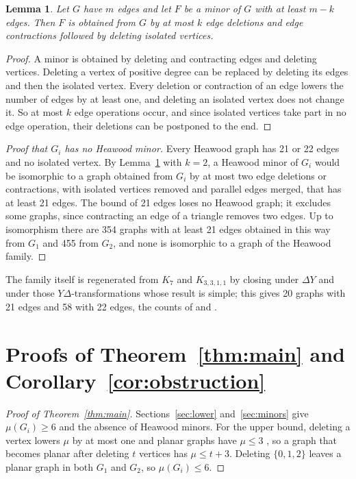 \documentclass[11pt]{article}
\newtheorem{lemma}[theorem]{Lemma}
\theoremstyle{remark}
\begin{document}
\begin{lemma}\label{lem:twoops}
Let $G$ have $m$ edges and let $F$ be a minor of $G$ with at least $m-k$
edges. Then $F$ is obtained from $G$ by at most $k$ edge deletions and
edge contractions followed by deleting isolated vertices.
\end{lemma}

\begin{proof}
A minor is obtained by deleting and contracting edges and deleting
vertices. Deleting a vertex of positive degree can be replaced by deleting
its edges and then the isolated vertex. Every deletion or contraction of
an edge lowers the number of edges by at least one, and deleting an
isolated vertex does not change it. So at most $k$ edge operations occur,
and since isolated vertices take part in no edge operation, their
deletions can be postponed to the end.
\end{proof}

\begin{proof}[Proof that $G_i$ has no Heawood minor]
Every Heawood graph has 21 or 22 edges and no isolated vertex. By
Lemma~\ref{lem:twoops} with $k=2$, a Heawood minor of $G_i$ would be
isomorphic to a graph obtained from $G_i$ by at most two edge deletions or
contractions, with isolated vertices removed and parallel edges merged,
that has at least 21 edges. The bound of 21 edges loses no Heawood graph;
it excludes some graphs, since contracting an edge of a triangle removes
two edges. Up to isomorphism there are 354 graphs with at least 21 edges
obtained in this way from $G_1$ and 455 from $G_2$, and none is isomorphic
to a graph of the Heawood family.
\end{proof}

The family itself is regenerated from $K_7$ and $K_{3,3,1,1}$ by closing
under $\Delta Y$ and under those $Y\Delta$-transformations whose result is
simple; this gives 20 graphs with 21 edges and 58 with 22 edges, the counts
of \cite[\S1.1]{GW} and \cite[\S3]{MP}.

\section{Proofs of Theorem~\ref{thm:main} and Corollary~\ref{cor:obstruction}}

\begin{proof}[Proof of Theorem~\ref{thm:main}]
Sections~\ref{sec:lower} and~\ref{sec:minors} give $\mu(G_i)\ge6$ and the
absence of Heawood minors. For the upper bound, deleting a vertex lowers
$\mu$ by at most one \cite[Theorem~2.7]{HLS} and planar graphs have
$\mu\le3$ \cite[1.4]{HLS}, so a graph that becomes planar after deleting
$t$ vertices has $\mu\le t+3$. Deleting $\{0,1,2\}$ leaves a planar graph
in both $G_1$ and $G_2$, so $\mu(G_i)\le6$.
\end{proof}
\end{document}
